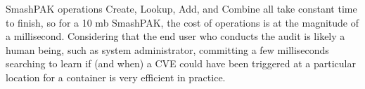 SmashPAK operations Create, Lookup, Add, and  Combine all take constant time to finish, so for a 10 mb SmashPAK, the cost of operations is at the magnitude of a millisecond. 
Considering that the end user who conducts the audit is likely a human being, such as system administrator, committing a few milliseconds searching to learn 
if (and when) a CVE could have been triggered at a particular location for a container is very efficient in practice.